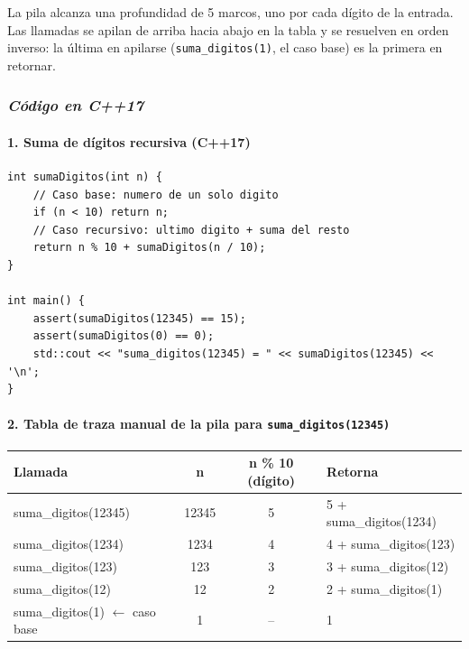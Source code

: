 \documentclass[12pt,a4paper]{article}
\begin{document}
\vspace{6pt}
La pila alcanza una profundidad de 5 marcos, uno por cada dígito de la entrada. Las
llamadas se apilan de arriba hacia abajo en la tabla y se resuelven en orden inverso:
la última en apilarse (\texttt{suma\_digitos(1)}, el caso base) es la primera en retornar.

\subsubsection*{\textit{Código en C++17}}

\paragraph{1. Suma de dígitos recursiva (C++17)}\mbox{}

\begin{lstlisting}[style=cpp]
int sumaDigitos(int n) {
    // Caso base: numero de un solo digito
    if (n < 10) return n;
    // Caso recursivo: ultimo digito + suma del resto
    return n % 10 + sumaDigitos(n / 10);
}

int main() {
    assert(sumaDigitos(12345) == 15);
    assert(sumaDigitos(0) == 0);
    std::cout << "suma_digitos(12345) = " << sumaDigitos(12345) << '\n';
}
\end{lstlisting}

\paragraph{2. Tabla de traza manual de la pila para \texttt{suma\_digitos(12345)}}\mbox{}

\begin{center}
\begin{tabular}{|l|c|c|l|}
\hline
\textbf{Llamada} & \textbf{n} & \textbf{n \% 10 (dígito)} & \textbf{Retorna} \\
\hline
suma\_digitos(12345) & 12345 & 5 & 5 + suma\_digitos(1234) \\
\hline
suma\_digitos(1234) & 1234 & 4 & 4 + suma\_digitos(123) \\
\hline
suma\_digitos(123) & 123 & 3 & 3 + suma\_digitos(12) \\
\hline
suma\_digitos(12) & 12 & 2 & 2 + suma\_digitos(1) \\
\hline
suma\_digitos(1) $\leftarrow$ caso base & 1 & -- & 1 \\
\hline
\end{tabular}
\end{center}
\end{document}
